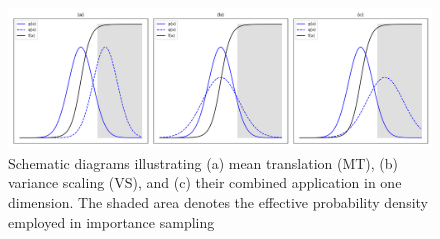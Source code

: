     \begin{figure}[H]
        \centering
        \includegraphics[scale=0.40]{Figures/Images/Methods/IS_techniques.png}
        \caption{Schematic diagrams illustrating (a) mean translation (MT), (b) variance scaling (VS), and (c) their combined application in one dimension. The shaded area denotes the effective probability density employed in importance sampling \protect\cite{lu_improved_1988}}
        \label{fig:IS_techniques}
    \end{figure}